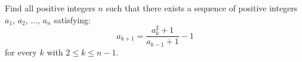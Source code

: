 Find all positive integers $n$ such that there exists a sequence of positive integers $a_1$,  $a_2$, $\ldots$,  $a_n$ satisfying: \[a_{k+1}=\frac{a_k^2+1}{a_{k-1}+1}-1\] for every $k$ with $2\leq k\leq n-1$.